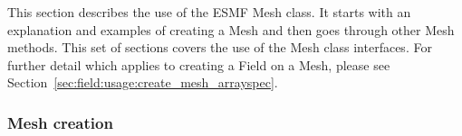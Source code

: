  
\setlength{\oldparskip}{\parskip}
\setlength{\parskip}{1.5ex}
\setlength{\oldparindent}{\parindent}
\setlength{\parindent}{0pt}
\setlength{\oldbaselineskip}{\baselineskip}
\setlength{\baselineskip}{11pt}
 
\def\bv{\begin{verbatim}}
\def\ev{\end{verbatim}}
\def\be{\begin{equation}}
\def\ee{\end{equation}}
\def\bea{\begin{eqnarray}}
\def\eea{\end{eqnarray}}
\def\bi{\begin{itemize}}
\def\ei{\end{itemize}}
\def\bn{\begin{enumerate}}
\def\en{\end{enumerate}}
\def\bd{\begin{description}}
\def\ed{\end{description}}
\def\({\left (}
\def\){\right )}
\def\[{\left [}
\def\]{\right ]}
\def\<{\left  \langle}
\def\>{\right \rangle}
\def\cI{{\cal I}}
\def\diag{\mathop{\rm diag}}
\def\tr{\mathop{\rm tr}}


 

  
   This section describes the use of the ESMF Mesh class. It starts with an explanation and examples of 
   creating a Mesh and then goes through other Mesh methods. This set of sections covers the use of the 
   Mesh class interfaces. For further detail which applies to creating a Field on a Mesh, please see
   Section~\ref{sec:field:usage:create_mesh_arrayspec}.
  
  \subsubsection{Mesh creation}
  \label{sec:mesh:usage:meshCreation}
  
